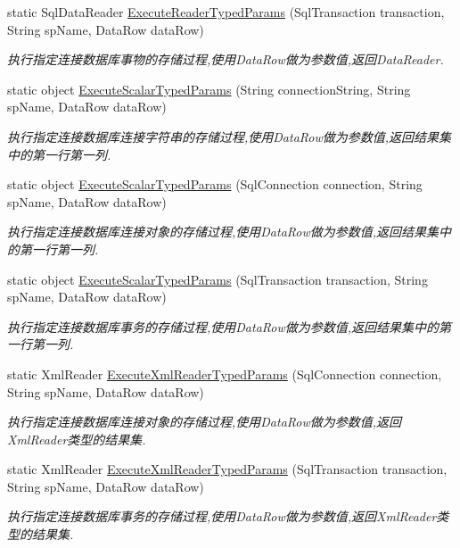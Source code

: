 \begin{DoxyCompactItemize}
static Sql\+Data\+Reader \hyperlink{class_x_c_l_net_tools_1_1_data_base_1_1_m_s_s_q_l_1_1_sql_helper_a40ee3a122708ca4b02a0fdcf04ec0cff}{Execute\+Reader\+Typed\+Params} (Sql\+Transaction transaction, String sp\+Name, Data\+Row data\+Row)
\begin{DoxyCompactList}\small\item\em 执行指定连接数据库事物的存储过程,使用\+Data\+Row做为参数值,返回\+Data\+Reader. \end{DoxyCompactList}\item 
static object \hyperlink{class_x_c_l_net_tools_1_1_data_base_1_1_m_s_s_q_l_1_1_sql_helper_a3fd8c1d336c69ad37c1534c6c7ea9ac5}{Execute\+Scalar\+Typed\+Params} (String connection\+String, String sp\+Name, Data\+Row data\+Row)
\begin{DoxyCompactList}\small\item\em 执行指定连接数据库连接字符串的存储过程,使用\+Data\+Row做为参数值,返回结果集中的第一行第一列. \end{DoxyCompactList}\item 
static object \hyperlink{class_x_c_l_net_tools_1_1_data_base_1_1_m_s_s_q_l_1_1_sql_helper_af228313b12488cf92cbb31e7c331d9a3}{Execute\+Scalar\+Typed\+Params} (Sql\+Connection connection, String sp\+Name, Data\+Row data\+Row)
\begin{DoxyCompactList}\small\item\em 执行指定连接数据库连接对象的存储过程,使用\+Data\+Row做为参数值,返回结果集中的第一行第一列. \end{DoxyCompactList}\item 
static object \hyperlink{class_x_c_l_net_tools_1_1_data_base_1_1_m_s_s_q_l_1_1_sql_helper_a07fae5fa10db00a6b1f46b9a7d934117}{Execute\+Scalar\+Typed\+Params} (Sql\+Transaction transaction, String sp\+Name, Data\+Row data\+Row)
\begin{DoxyCompactList}\small\item\em 执行指定连接数据库事务的存储过程,使用\+Data\+Row做为参数值,返回结果集中的第一行第一列. \end{DoxyCompactList}\item 
static Xml\+Reader \hyperlink{class_x_c_l_net_tools_1_1_data_base_1_1_m_s_s_q_l_1_1_sql_helper_a43fe7cde3a7b3b999d66aa53f654d363}{Execute\+Xml\+Reader\+Typed\+Params} (Sql\+Connection connection, String sp\+Name, Data\+Row data\+Row)
\begin{DoxyCompactList}\small\item\em 执行指定连接数据库连接对象的存储过程,使用\+Data\+Row做为参数值,返回\+Xml\+Reader类型的结果集. \end{DoxyCompactList}\item 
static Xml\+Reader \hyperlink{class_x_c_l_net_tools_1_1_data_base_1_1_m_s_s_q_l_1_1_sql_helper_a51c3cdda89ada8ca4fda0f3d513b8214}{Execute\+Xml\+Reader\+Typed\+Params} (Sql\+Transaction transaction, String sp\+Name, Data\+Row data\+Row)
\begin{DoxyCompactList}\small\item\em 执行指定连接数据库事务的存储过程,使用\+Data\+Row做为参数值,返回\+Xml\+Reader类型的结果集. \end{DoxyCompactList}\end{DoxyCompactItemize}


